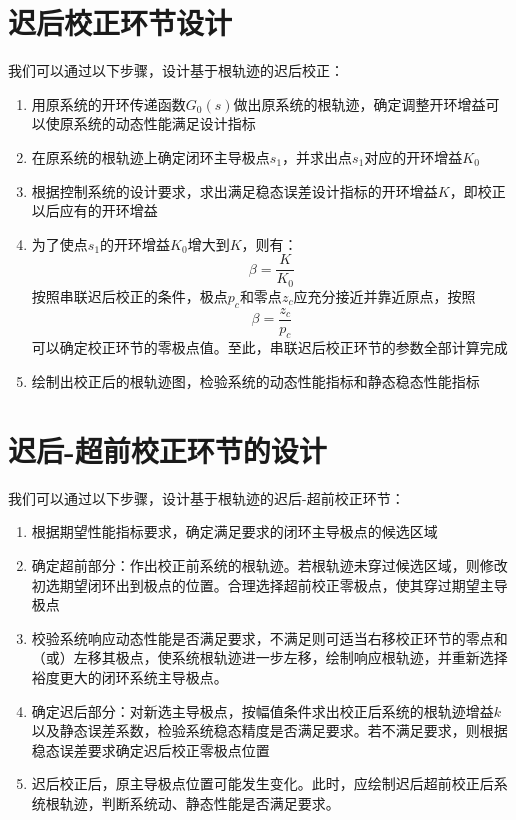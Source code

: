 \section{迟后校正环节设计}

我们可以通过以下步骤，设计基于根轨迹的迟后校正：
\begin{enumerate}
    \item 用原系统的开环传递函数$G_0(s)$做出原系统的根轨迹，确定调整开环增益可以使原系统的动态性能满足设计指标
    \item 在原系统的根轨迹上确定闭环主导极点$s_1$，并求出点$s_1$对应的开环增益$K_0$
    \item 根据控制系统的设计要求，求出满足稳态误差设计指标的开环增益$K$，即校正以后应有的开环增益
    \item 为了使点$s_1$的开环增益$K_0$增大到$K$，则有：
    \begin{equation*}
        \beta = \frac{K}{K_0}
    \end{equation*}
    按照串联迟后校正的条件，极点$p_c$和零点$z_c$应充分接近并靠近原点，按照
    \begin{equation*}
        \beta = \frac{z_c}{p_c}
    \end{equation*}
    可以确定校正环节的零极点值。至此，串联迟后校正环节的参数全部计算完成
    \item 绘制出校正后的根轨迹图，检验系统的动态性能指标和静态稳态性能指标
\end{enumerate}

\section{迟后-超前校正环节的设计}

我们可以通过以下步骤，设计基于根轨迹的迟后-超前校正环节：
\begin{enumerate}
    \item 根据期望性能指标要求，确定满足要求的闭环主导极点的候选区域
    \item 确定超前部分：作出校正前系统的根轨迹。若根轨迹未穿过候选区域，则修改初选期望闭环出到极点的位置。合理选择超前校正零极点，使其穿过期望主导极点
    \item 校验系统响应动态性能是否满足要求，不满足则可适当右移校正环节的零点和（或）左移其极点，使系统根轨迹进一步左移，绘制响应根轨迹，并重新选择裕度更大的闭环系统主导极点。
    \item 确定迟后部分：对新选主导极点，按幅值条件求出校正后系统的根轨迹增益$k$以及静态误差系数，检验系统稳态精度是否满足要求。若不满足要求，则根据稳态误差要求确定迟后校正零极点位置
    \item 迟后校正后，原主导极点位置可能发生变化。此时，应绘制迟后超前校正后系统根轨迹，判断系统动、静态性能是否满足要求。
\end{enumerate}

